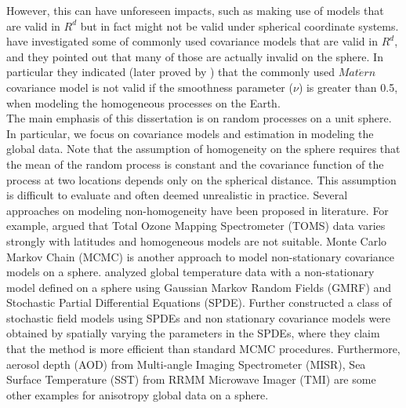 However, this can have unforeseen impacts, such as making use of models that are valid in $R^d$ but in fact might not be valid under spherical coordinate systems. \cite{HuangZhangRobeson2011} have investigated some of commonly used covariance models that are valid in $R^d$, and they pointed out that many of those are actually invalid on the sphere. In particular they indicated (later proved by \cite{Gneiting2013}) that the commonly used $Mat\acute{e}rn$ covariance model is not valid if the smoothness parameter ($\nu$) is greater than 0.5, when modeling the homogeneous processes on the Earth. \\



The main emphasis of this dissertation is on random processes on a unit sphere. In particular, we focus on covariance models and estimation in modeling the global data. Note that the assumption of homogeneity on the sphere requires that the mean of the random process is constant and the covariance function of the process at two locations depends only on the spherical distance. This assumption is difficult to evaluate and often deemed unrealistic in practice. Several approaches on modeling non-homogeneity have been proposed in literature. For example, \cite{Stein2007} argued that Total Ozone Mapping Spectrometer (TOMS) data varies strongly with latitudes and homogeneous models are not suitable. Monte Carlo Markov Chain (MCMC) is another approach to model non-stationary covariance models on a sphere. \cite{Lindgren2011} analyzed global temperature data with a non-stationary model defined on a sphere using Gaussian Markov Random Fields (GMRF) and Stochastic Partial Differential Equations (SPDE). Further \cite{BolinLindgren2011} constructed a class of stochastic field models using SPDEs and non stationary covariance models were obtained by spatially varying the parameters in the SPDEs, where they claim that the method is more efficient than standard MCMC procedures. Furthermore, aerosol depth (AOD) from Multi-angle Imaging Spectrometer (MISR), Sea Surface Temperature (SST) from RRMM Microwave Imager (TMI) are some other examples for anisotropy global data on a sphere. \\

